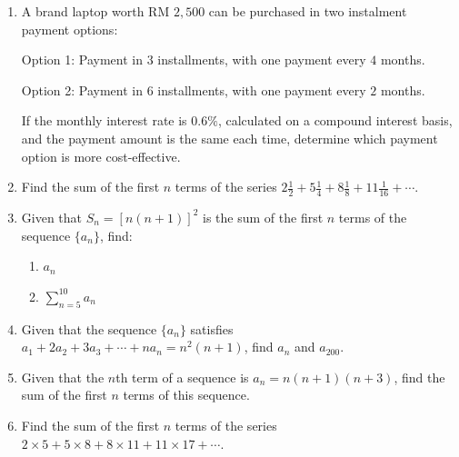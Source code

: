 \documentclass{report}
\begin{document}
\begin{enumerate}
            \item A brand laptop worth RM $2,500$ can be purchased in two instalment payment options:
            
            Option 1: Payment in $3$ installments, with one payment every $4$ months.
            
            Option 2: Payment in $6$ installments, with one payment every $2$ months.
            
            If the monthly interest rate is $0.6\%$, calculated on a compound interest basis, and the payment amount is the same each time, determine which payment option is more cost-effective.
            
            \item Find the sum of the first \(n\) terms of the series \(2\frac{1}{2}+5\frac{1}{4}+8\frac{1}{8}+11\frac{1}{16}+\cdots\).
            
            \item Given that \(S_{n}=[n(n+1)]^{2}\) is the sum of the first \(n\) terms of the sequence \(\{a_{n}\}\), find:
            \begin{enumerate}
                \item \(a_{n}\)
                \item \(\displaystyle\sum_{n=5}^{10} a_{n}\)
            \end{enumerate}
            
            \item Given that the sequence \(\{a_{n}\}\) satisfies \(a_{1}+2a_{2}+3a_{3}+\cdots+na_{n}=n^{2}(n+1)\), find \(a_{n}\) and \(a_{200}\).
            
            \item Given that the \(n\)th term of a sequence is \(a_{n}=n(n+1)(n+3)\), find the sum of the first \(n\) terms of this sequence.
            
            \item Find the sum of the first \(n\) terms of the series \(2 \times 5+5 \times 8+8 \times 11+11 \times 17+\cdots\).
        \end{enumerate}
\end{document}
